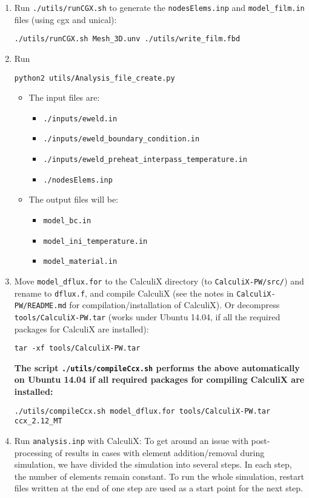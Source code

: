 \documentclass[12pt,letterpaper]{article}
\newcommand{\verbStyle}[1]{{\color{SteelBlue40}\colorbox{LightSteelBlue10}{{#1}}}}
\let\OldTexttt\texttt
\renewcommand{\texttt}[1]{\OldTexttt{\verbStyle{#1}}}
\begin{document}
\begin{itemize}
\begin{enumerate}
\item Run \texttt{./utils/runCGX.sh} to generate the \texttt{nodesElems.inp} and \texttt{model\_film.in} files (using cgx and unical):
\begin{verbatim}
./utils/runCGX.sh Mesh_3D.unv ./utils/write_film.fbd
\end{verbatim}
\item Run 
\begin{verbatim}
python2 utils/Analysis_file_create.py
\end{verbatim}
\begin{itemize}
\item The input files are:
\begin{itemize}
\item \texttt{./inputs/eweld.in}
\item \texttt{./inputs/eweld\_boundary\_condition.in}
\item \texttt{./inputs/eweld\_preheat\_interpass\_temperature.in}
\item \texttt{./nodesElems.inp}
\end{itemize}
\item The output files will be: 
\begin{itemize}
\item \texttt{model\_bc.in}
\item \texttt{model\_ini\_temperature.in}
\item \texttt{model\_material.in}
\end{itemize}
\end{itemize}
\item Move \texttt{model\_dflux.for} to the CalculiX directory (to \texttt{CalculiX-PW/src/}) and rename to \texttt{dflux.f}, and compile CalculiX
(see the notes in \texttt{CalculiX-PW/README.md} for compilation/installation of CalculiX).
Or decompress \texttt{tools/CalculiX-PW.tar} (works under Ubuntu 14.04, if all the required packages for CalculiX are installed):
\begin{verbatim}
tar -xf tools/CalculiX-PW.tar
\end{verbatim}
\textbf{The script \texttt{./utils/compileCcx.sh} performs the above automatically on Ubuntu 14.04 if all required packages for compiling CalculiX are installed:}
\begin{verbatim}
./utils/compileCcx.sh model_dflux.for tools/CalculiX-PW.tar ccx_2.12_MT
\end{verbatim}
\item Run \texttt{analysis.inp} with CalculiX: 
To get around an issue with post-processing of results in 
cases with element addition/removal during simulation, we have
divided the simulation into several steps. In each step, 
the number of elements remain constant. To run the whole
simulation, restart files written at the end of one step are
used as a start point for the next step.  


\end{enumerate}
\end{itemize}
\end{document}
